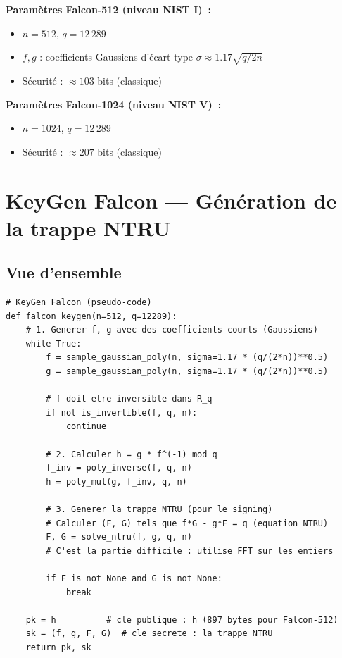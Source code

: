\documentclass[12pt, a4paper]{article}
\begin{document}
\begin{importantbox}
\textbf{Paramètres Falcon-512 (niveau NIST I)~:}
\begin{itemize}
  \item $n = 512$, $q = 12\,289$
  \item $f, g$ : coefficients Gaussiens d'écart-type $\sigma \approx 1.17\sqrt{q/2n}$
  \item Sécurité : $\approx 103$ bits (classique)
\end{itemize}

\textbf{Paramètres Falcon-1024 (niveau NIST V)~:}
\begin{itemize}
  \item $n = 1024$, $q = 12\,289$
  \item Sécurité : $\approx 207$ bits (classique)
\end{itemize}
\end{importantbox}

\section{KeyGen Falcon --- Génération de la trappe NTRU}

\subsection{Vue d'ensemble}

\begin{lstlisting}[style=python]
# KeyGen Falcon (pseudo-code)
def falcon_keygen(n=512, q=12289):
    # 1. Generer f, g avec des coefficients courts (Gaussiens)
    while True:
        f = sample_gaussian_poly(n, sigma=1.17 * (q/(2*n))**0.5)
        g = sample_gaussian_poly(n, sigma=1.17 * (q/(2*n))**0.5)

        # f doit etre inversible dans R_q
        if not is_invertible(f, q, n):
            continue

        # 2. Calculer h = g * f^(-1) mod q
        f_inv = poly_inverse(f, q, n)
        h = poly_mul(g, f_inv, q, n)

        # 3. Generer la trappe NTRU (pour le signing)
        # Calculer (F, G) tels que f*G - g*F = q (equation NTRU)
        F, G = solve_ntru(f, g, q, n)
        # C'est la partie difficile : utilise FFT sur les entiers

        if F is not None and G is not None:
            break

    pk = h          # cle publique : h (897 bytes pour Falcon-512)
    sk = (f, g, F, G)  # cle secrete : la trappe NTRU
    return pk, sk
\end{lstlisting}
\end{document}
